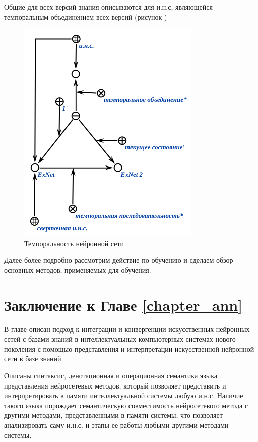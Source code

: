 Общие для всех версий знания описываются для и.н.с, являющейся темпоральным объединением всех версий (рисунок )

\begin{figure}[H]
	\centering
	\includegraphics[scale=0.8]{author/part3/figures/temporal_neural_network_scg.png}
	\caption{Темпоральность нейронной сети}
	\label{fig:temporal_neural_network_scg}
\end{figure}

Далее более подробно рассмотрим действие по обучению  и сделаем обзор основных методов, применяемых для обучения.

\section*{Заключение к Главе \ref{chapter_ann}}
В главе описан подход к интеграции и конвергенции искусственных нейронных сетей с базами знаний в интеллектуальных компьютерных системах нового поколения с помощью представления и интерпретации искусственной нейронной сети в базе знаний.

Описаны синтаксис, денотационная и операционная семантика языка представления нейросетевых методов, который позволяет представить и интерпретировать в памяти интеллектуальной системы любую и.н.с. Наличие такого языка порождает семантическую совместимость нейросетевого метода с другими методами, представленными в памяти системы, что позволяет анализировать саму и.н.с. и этапы ее работы любыми другими методами системы.

